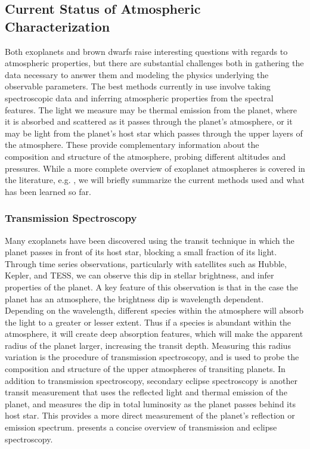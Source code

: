 \subsection{Current Status of Atmospheric Characterization}
Both exoplanets and brown dwarfs raise interesting questions with regards to atmospheric properties, but there are substantial challenges both in gathering the data necessary to answer them and modeling the physics underlying the observable parameters. 
The best methods currently in use involve taking spectroscopic data and inferring atmospheric properties from the spectral features.
The light we measure may be thermal emission from the planet, where it is absorbed and scattered as it passes through the planet's atmosphere, or it may be light from the planet's host star which passes through the upper layers of the atmosphere.
These provide complementary information about the composition and structure of the atmosphere, probing different altitudes and pressures.
While a more complete overview of exoplanet atmospheres is covered in the literature, e.g. \parencite{Bozza,Madhusudhan2014,Seager2010}, we will briefly summarize the current methods used and what has been learned so far.
\subsubsection{Transmission Spectroscopy}
Many exoplanets have been discovered using the transit technique in which the planet passes in front of its host star, blocking a small fraction of its light.
Through time series observations, particularly with satellites such as Hubble, Kepler, and TESS, we can observe this dip in stellar brightness, and infer properties of the planet.
A key feature of this observation is that in the case the planet has an atmosphere, the brightness dip is wavelength dependent.
Depending on the wavelength, different species within the atmosphere will absorb the light to a greater or lesser extent.
Thus if a species is abundant within the atmosphere, it will create deep absorption features, which will make the apparent radius of the planet larger, increasing the transit depth.
Measuring this radius variation is the procedure of transmission spectroscopy, and is used to probe the composition and structure of the upper atmospheres of transiting planets.
In addition to transmission spectroscopy, secondary eclipse spectroscopy is another transit measurement that uses the reflected light and thermal emission of the planet, and measures the dip in total luminosity as the planet passes behind its host star.
This provides a more direct measurement of the planet's reflection or emission spectrum.
\parencite{Kreidberg2018} presents a concise overview of transmission and eclipse spectroscopy.

